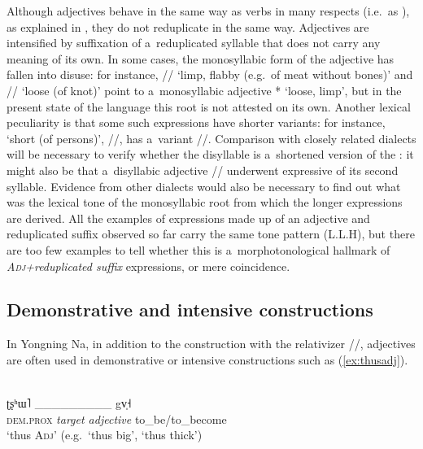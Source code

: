 Although adjectives behave in the same way as verbs in many respects (i.e.\ as ), as explained in ,
they do not reduplicate in the same way. Adjectives are intensified by suffixation of a~reduplicated
syllable that does not carry any meaning of its own. In some cases, the monosyllabic form of the adjective has fallen into disuse: for instance, // ‘limp, flabby (e.g.~of meat without bones)’ and // ‘loose (of knot)’ point to a~{monosyllabic} adjective * ‘loose, limp’, but in the present state of the language this
root is not attested on its own. Another lexical peculiarity is that some such expressions have shorter variants: for instance, ‘short (of persons)’, //, has a~variant //. Comparison with closely related dialects will be necessary to verify whether the disyllable is a~shortened version of the : it might also be that a~disyllabic adjective // underwent expressive  of its second syllable. Evidence from other dialects would also be necessary to find out what was the lexical tone of the monosyllabic root from which the longer expressions are derived. All the examples of expressions made up of an adjective and reduplicated suffix observed so far carry the same tone pattern (L.L.H), but there are too few examples to tell whether this is a~morphotonological hallmark of \textit{\textsc{Adj}+reduplicated suffix} expressions, or mere coincidence.

\subsection{Demonstrative and intensive constructions}
\label{sec:demonstrativeandintensiveconstructions}

In Yongning Na, in addition to the construction with the {relativizer}
\mbox{//}, adjectives are often used in demonstrative or intensive constructions such as (\ref{ex:thusadj}).

\begin{exe}
	\ex
	\label{ex:thusadj}
	\\
	\gll 	ʈʂʰɯ˥					{\_\_\_\_\_\_\_\_\_}			gv̩˧\\
	\textsc{dem.prox}		\textit{{target adjective}}	to\_be/to\_become\\
	\glt ‘thus \textsc{Adj}’ (e.g.~‘thus big’, ‘thus thick’)
\end{exe}


